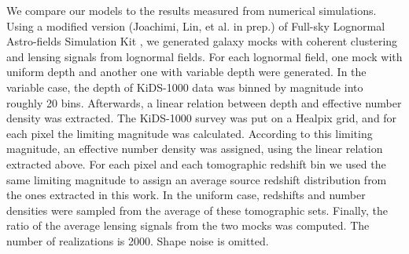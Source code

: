 \documentclass[referee]{aa} %
\renewcommand{\[}{\begin{equation}}
\renewcommand{\]}{\end{equation}}
\begin{document}
We compare our models to the results measured from numerical simulations. Using a modified version (Joachimi, Lin, et al. in prep.) of Full-sky Lognormal Astro-fields Simulation Kit \citep[FLASK,][]{Xavier:2016}, we generated galaxy mocks with coherent clustering and lensing signals from lognormal fields. For each lognormal field, one mock with uniform depth and another one with variable depth were generated. In the variable case, the depth of KiDS-1000 data \citep{Kuijken:2019} was binned by magnitude into roughly 20 bins. Afterwards, a linear relation between depth and effective number density was extracted. The KiDS-1000 survey was put on a Healpix grid, and for each pixel the limiting magnitude was calculated. According to this limiting magnitude, an effective number density was assigned, using the linear relation extracted above. For each pixel and each tomographic redshift bin we used the same limiting magnitude to assign an average source redshift distribution from the ones extracted in this work. In the uniform case, redshifts and number densities were sampled from the average of these tomographic sets. Finally, the ratio of the average lensing signals from the two mocks was computed. The number of realizations is 2000. Shape noise is omitted. 
\end{document}
